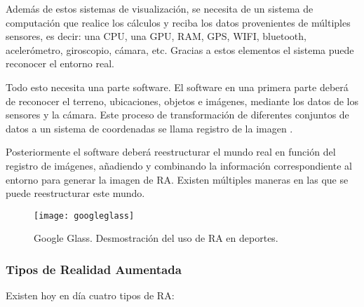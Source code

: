 Además de estos sistemas de visualización, se necesita de un sistema de computación que realice los cálculos y reciba los datos provenientes de múltiples sensores, es decir: una CPU, una GPU, RAM, GPS, WIFI, bluetooth, acelerómetro, giroscopio, cámara, etc. Gracias a estos elementos el sistema puede reconocer el entorno real.

Todo esto necesita una parte software. El software en una primera parte deberá de reconocer el terreno, ubicaciones, objetos e imágenes, mediante los datos de los sensores y la cámara. Este proceso de transformación de diferentes conjuntos de datos a un sistema de coordenadas se llama registro de la imagen \cite{URL::ImageRegister}. 

Posteriormente el software deberá reestructurar el mundo real en función del registro de imágenes, añadiendo y combinando la información correspondiente al entorno para generar la imagen de RA. Existen múltiples maneras en las que se puede reestructurar este mundo. 

\begin{figure}[h]
    \centering
    \texttt{[image: googleglass]}
    \caption{Google Glass. Desmostración del uso de RA en deportes.}
    \label{fig:googleglass}
\end{figure}

\subsubsection{Tipos de Realidad Aumentada}

Existen hoy en día cuatro tipos de RA:

